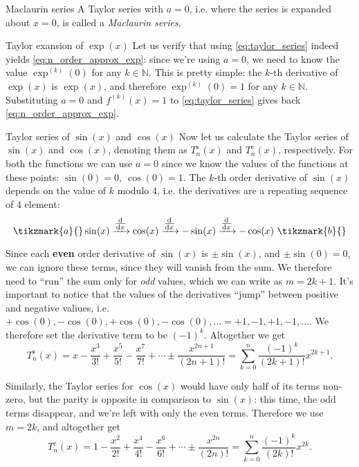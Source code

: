 \begin{note}{Maclaurin series}{}
  A Taylor series with $a=0$, i.e. where the series is expanded about $x=0$, is called a \emph{Maclaurin series}.
\end{note}

\begin{example}{Taylor exansion of $\exp(x)$}{}
  Let us verify that using \autoref{eq:taylor_series} indeed yields \autoref{eq:n_order_approx_exp}: since we're using $a=0$, we need to know the value $\exp^{(k)}(0)$ for any $k\in\mathbb{N}$. This is pretty simple: the $k$-th derivative of $\exp(x)$ is $\exp(x)$, and therefore $\exp^{(k)}(0)=1$ for any $k\in\mathbb{N}$. Substituting $a=0$ and $f^{(k)}(x)=1$ to \autoref{eq:taylor_series} gives back \autoref{eq:n_order_approx_exp}.
\end{example}

\begin{example}{Taylor series of $\sin(x)$ and $\cos(x)$}{}
  Now let us calculate the Taylor series of $\sin(x)$ and $\cos(x)$, denoting them as $T^{\text{s}}_{n}(x)$ and $T^{\text{c}}_{n}(x)$, respectively. For both the functions we can use $a=0$ since we know the values of the functions at these points: $\sin(0)=0,\ \cos(0)=1$. The $k$-th order derivative of $\sin(x)$ depends on the value of $k$ modulo $4$, i.e. the derivatives are a repeating sequence of $4$ element:
  \[
    \tikzmark{a}{}\sin(x) \xrightarrow[]{\od{}{x}} \cos(x) \xrightarrow[]{\od{}{x}} -\sin(x) \xrightarrow[]{\od{}{x}} -\cos(x)\ \tikzmark{b}{}
  \]

  \vspace{1em}
  Since each \textbf{even} order derivative of $\sin(x)$ is $\pm\sin(x)$, and $\pm\sin(0)=0$, we can ignore these terms, since they will vanish from the sum. We therefore need to ``run'' the sum only for \emph{odd} values, which we can write as $m=2k+1$. It's important to notice that the values of the derivatives ``jump'' between positive and negative valiues, i.e. $+\cos(0),-\cos(0),+\cos(0),-\cos(0),\dots = +1,-1,+1,-1,\dots$. We therefore set the derivative term to be $(-1)^{k}$. Altogether we get
  \[
    T^{\text{s}}_{n}(x) = x-\frac{x^{3}}{3!}+\frac{x^{5}}{5!}-\frac{x^{7}}{7!}+\cdots\pm\frac{x^{2n+1}}{(2n+1)!} = \sum\limits_{k=0}^{n}\frac{(-1)^{k}}{(2k+1)!}x^{2k+1}.
  \]

  Similarly, the Taylor series for $\cos(x)$ would have only half of its terms non-zero, but the parity is opposite in comparison to $\sin(x)$: this time, the odd terms disappear, and we're left with only the even terms. Therefore we use $m=2k$, and altogether get
  \[
    T^{\text{c}}_{n}(x) = 1-\frac{x^{2}}{2!}+\frac{x^{4}}{4!}-\frac{x^{6}}{6!}+\cdots\pm\frac{x^{2n}}{(2n)!} = \sum\limits_{k=0}^{n}\frac{(-1)^{k}}{(2k)!}x^{2k}.
  \]
\end{example}

